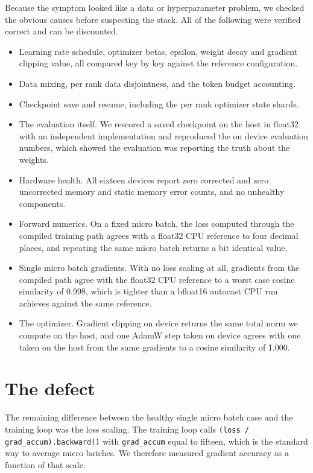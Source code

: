 \documentclass[11pt,a4paper]{article}
\newcommand{\code}[1]{\texttt{\small #1}}
\begin{document}
Because the symptom looked like a data or hyperparameter problem, we checked the
obvious causes before suspecting the stack. All of the following were verified
correct and can be discounted.

\begin{itemize}
\item Learning rate schedule, optimizer betas, epsilon, weight decay and gradient
      clipping value, all compared key by key against the reference configuration.
\item Data mixing, per rank data disjointness, and the token budget accounting.
\item Checkpoint save and resume, including the per rank optimizer state shards.
\item The evaluation itself. We rescored a saved checkpoint on the host in float32
      with an independent implementation and reproduced the on device evaluation
      numbers, which showed the evaluation was reporting the truth about the weights.
\item Hardware health. All sixteen devices report zero corrected and zero
      uncorrected memory and static memory error counts, and no unhealthy components.
\item Forward numerics. On a fixed micro batch, the loss computed through the
      compiled training path agrees with a float32 CPU reference to four decimal
      places, and repeating the same micro batch returns a bit identical value.
\item Single micro batch gradients. With no loss scaling at all, gradients from the
      compiled path agree with the float32 CPU reference to a worst case cosine
      similarity of 0.998, which is tighter than a bfloat16 autocast CPU run
      achieves against the same reference.
\item The optimizer. Gradient clipping on device returns the same total norm we
      compute on the host, and one AdamW step taken on device agrees with one taken
      on the host from the same gradients to a cosine similarity of 1.000.
\end{itemize}

\section{The defect}

The remaining difference between the healthy single micro batch case and the
training loop was the loss scaling. The training loop calls
\code{(loss / grad\_accum).backward()} with \code{grad\_accum} equal to fifteen,
which is the standard way to average micro batches. We therefore measured
gradient accuracy as a function of that scale.
\end{document}
